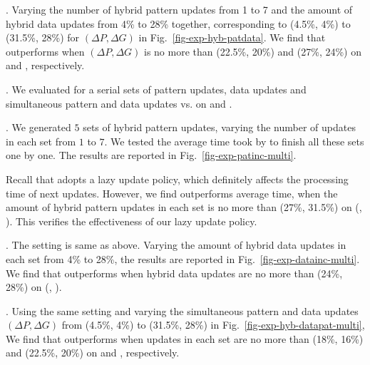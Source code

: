 .  Varying the number of hybrid pattern updates from 1 to 7 and the amount of hybrid data updates from 4\% to 28\% together, corresponding to (4.5\%, 4\%) to (31.5\%, 28\%) for $(\Delta P, \Delta G)$ in Fig.~\ref{fig-exp-hyb-patdata}. We find that \inc outperforms \optgrouprec when $(\Delta P, \Delta G)$ is no more than (22.5\%, 20\%) and (27\%, 24\%) on \citationd and \synthetic, respectively.



. We evaluated \inc for a serial sets of pattern updates, data updates and simultaneous pattern and data updates vs. \optgrouprec on \citationd and \synthetic.


. We generated $5$ sets of hybrid pattern updates, varying the number of updates in each set from $1$ to $7$.
We tested the average time took by \inc to finish all these sets one by one.
The results are reported in Fig.~\ref{fig-exp-patinc-multi}.

Recall that \inc adopts a lazy update policy, which definitely affects the processing time of next updates.
However, we find \inc outperforms \optgrouprec \wrt average time, when the amount of hybrid  pattern updates in each set is no more than (27\%, 31.5\%)  on (\citationd, \synthetic). This verifies the effectiveness of our lazy update policy.


. The setting is same as above. Varying the amount of hybrid data updates in each set from 4\% to 28\%,
the results are reported in Fig.~\ref{fig-exp-datainc-multi}.
We find that \inc outperforms \optgrouprec when hybrid data updates are no more than (24\%, 28\%) on (\citationd, \synthetic).



. Using the same setting and varying the simultaneous pattern and data updates $(\Delta P, \Delta G)$ from (4.5\%, 4\%) to (31.5\%, 28\%) in Fig.~\ref{fig-exp-hyb-datapat-multi},
We find that \inc outperforms \optgrouprec when updates in each set are no more than (18\%, 16\%) and (22.5\%, 20\%)
on \citationd and \synthetic, respectively.

